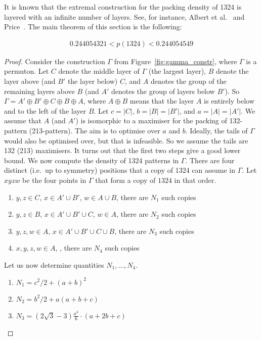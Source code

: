 \documentclass[12pt, a4paper, twoside]{report}
\begin{document}
It is known that the extremal construction for the packing density of 1324 is layered with an infinite number of layers. See, for instance, Albert et al.~\cite{albert2002packing} and Price~\cite{price1997packing}. The main theorem of this section is the following: 
\begin{theorem}
\label{thm:pack1324}
\begin{align*}
0.244054321 < p(1324) < 0.244054549
\end{align*}
\end{theorem}

\begin{proof}
  Consider the construction $\Gamma$ from Figure~\ref{fig:gamma_constr}, where $\Gamma$ is a permuton. Let $C$ denote the middle layer of $\Gamma$ (the largest layer), $B$ denote the layer above (and $B'$ the layer below) $C$, and $A$ denotes the group of the remaining layers above $B$ (and $A'$ denotes the group of layers below $B'$). So $\Gamma = A' \oplus B' \oplus C \oplus B \oplus A$, where $A \oplus B$ means that the layer $A$ is entirely below and to the left of the layer $B$. Let $c = |C|$, $b = |B| = |B'|$, and $a =  |A| = |A'|$. We assume that $A$ (and $A'$) is isomorphic to a maximiser for the packing of 132-pattern (213-pattern). The aim is to optimise over $a$ and $b$. Ideally, the tails of $\Gamma$ would also be optimised over, but that is infeasible. So we assume the tails are 132 (213) maximisers. It turns out that the first two steps give a good lower bound. We now compute the density of 1324 patterns in $\Gamma$. There are four distinct (i.e.~up to symmetry) positions that a copy of 1324 can assume in $\Gamma$. Let $xyzw$ be the four points in $\Gamma$ that form a copy of $1324$ in that order.
\begin{enumerate}
\item $y,z \in C$, $x \in A' \cup B'$, $w \in A \cup B$, there are $N_1$ such copies
\item $y,z \in B$, $x \in A' \cup B' \cup C$, $w \in A$, there are $N_2$ such copies
\item $y,z,w \in A$, $x \in A' \cup B' \cup C \cup B$, there are $N_3$ such copies
\item $x,y,z,w \in A$, , there are $N_4$ such copies
\end{enumerate}
Let us now determine quantities $N_1,\ldots, N_4$. 
\begin{enumerate}
\item $N_1 = c^2/2 + (a+b)^2$
\item $N_2 = b^2/2 + a(a+b+c)$
\item $N_3 = (2\sqrt{3}-3)\frac{a^3}{6}\cdot (a+2b+c)$

\end{enumerate}
\end{proof}
\end{document}
